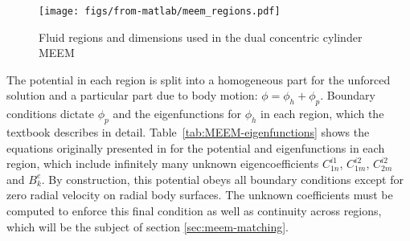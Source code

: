 \begin{appendices}
\begin{figure}
    \centering
    \texttt{[image: figs/from-matlab/meem\_regions.pdf]}
    \caption{Fluid regions and dimensions used in the dual concentric cylinder MEEM}
    \label{fig:meem-regions}
\end{figure}

 The potential in each region is split into a homogeneous part for the unforced solution and a particular part due to body motion: $\phi=\phi_h+\phi_p$.
Boundary conditions dictate $\phi_p$ and the eigenfunctions for $\phi_h$ in each region, which the textbook \cite{chatjigeorgiou_analytical_2018} describes in detail.
Table~\ref{tab:MEEM-eigenfunctions} shows the equations originally presented in \cite{chau_inertia_2010,chau_inertia_2012} for the potential and eigenfunctions in each region, which include infinitely many unknown eigencoefficients $C_{1n}^{i1}$, $C_{1m}^{i2}$, $C_{2m}^{i2}$ and $B_{k}^{e}$.
By construction, this potential obeys all boundary conditions except for zero radial velocity on radial body surfaces.
The unknown coefficients must be computed to enforce this final condition as well as continuity across regions, which will be the subject of section \ref{sec:meem-matching}.


\end{appendices}
